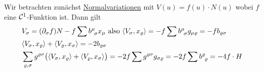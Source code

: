 \begin{beweis}
Wir betrachten zunächst \uline{Normalvariationen} mit \(V(u) = f(u) \cdot N(u)\) wobei \(f\) eine \(\mathcal{C}^1\)-Funktion ist. Dann gilt
\begin{align*}
 &V_\sigma = (\partial_\sigma f) N - f \sum b^{\mu}_{\;\, \sigma} x_\mu \text{ also } \langle V_\sigma, x_\varrho \rangle = -f \sum b^{\mu}_{\;\, \sigma} g_{\mu \varrho} = -f b_{\varrho \sigma} \\
 &\langle V_\sigma, x_\varrho \rangle + \langle V_\varrho, x_\sigma \rangle = -2 b_{\varrho \sigma} \\
 &\sum_{\varrho, \sigma} g^{\varrho \sigma} \big(\langle V_\sigma, x_\varrho \rangle + \langle V_\varrho, x_\sigma \rangle \big) = -2 f \sum g^{\varrho \sigma} g_{\sigma \varrho} = -2f \sum b^{\varrho}_{\;\, \varrho} = -4 f \cdot H
\end{align*}


\end{beweis}
